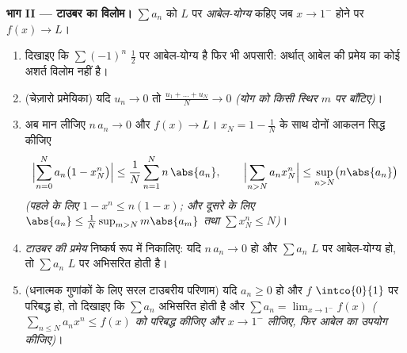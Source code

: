 \begin{problem}
\medskip
\noindent\textbf{भाग II --- टाउबर का विलोम।} $\sum
a_n$ को $L$ पर
\emph{आबेल-योग्य} कहिए जब $x \to
1^-$ होने पर $f(x) \to L$।
\begin{enumerate}[resume]
  \item दिखाइए कि $\sum (-1)^n$ $\frac12$ पर आबेल-योग्य है फिर भी अपसारी: अर्थात् आबेल
        की प्रमेय का कोई अशर्त विलोम नहीं है।
  \item (चेज़ारो प्रमेयिका) यदि $u_n \to 0$ तो $\frac{u_1 + \dots
        + u_N}{N} \to 0$ \emph{(योग को किसी स्थिर $m$
        पर बाँटिए)}।
  \item अब मान लीजिए $n\,a_n \to 0$ और $f(x) \to L$। $x_N =
        1 - \frac1N$ के साथ दोनों आकलन सिद्ध कीजिए
        \[
        \Bigl|\sum_{n=0}^{N} a_n\bigl(1 - x_N^n\bigr)\Bigr|
        \leq \frac{1}{N}\sum_{n=1}^{N} n\,\abs{a_n},
        \qquad
        \Bigl|\sum_{n>N} a_n x_N^n\Bigr|
        \leq \sup_{n>N}\bigl(n\abs{a_n}\bigr)
        \]
        \emph{(पहले के लिए $1 - x^n \leq n(1-x)$; और दूसरे के लिए $\abs{a_n} \leq \frac{1}{N}\sup_{m>N}
        m\abs{a_m}$ तथा $\sum x_N^n \leq N$)}।
  \item \emph{टाउबर की प्रमेय} निष्कर्ष रूप में निकालिए: यदि $n\,a_n \to 0$ हो और
        $\sum a_n$ $L$ पर आबेल-योग्य हो, तो $\sum a_n$ $L$ पर अभिसरित होती है।
  \item (धनात्मक गुणांकों के लिए सरल टाउबरीय परिणाम) यदि $a_n
        \geq 0$ हो और $f$
        $\intco{0}{1}$ पर परिबद्ध हो, तो दिखाइए कि $\sum a_n$ अभिसरित होती है और $\sum a_n = \lim_{x\to1^-}
        f(x)$
        \emph{($\sum_{n\leq N}a_nx^n \leq f(x)$ को परिबद्ध कीजिए और $x \to 1^-$ लीजिए, फिर आबेल का उपयोग
        कीजिए)}।
\end{enumerate}


\end{problem}
